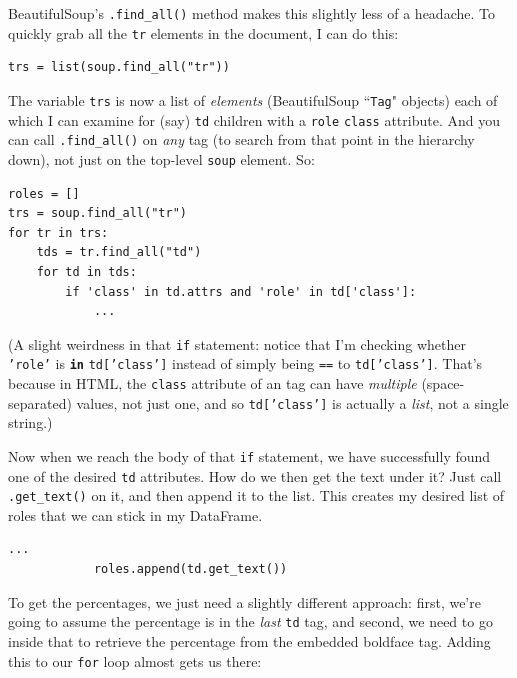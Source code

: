 \documentclass[12pt]{article}
\begin{document}
BeautifulSoup's \texttt{.find\_all()} method makes this slightly less of a
headache. To quickly grab all the \texttt{tr} elements in the document, I can
do this:

\begin{Verbatim}[fontsize=\small,samepage=true,frame=none]
trs = list(soup.find_all("tr"))
\end{Verbatim}

The variable \texttt{trs} is now a list of \textit{elements} (BeautifulSoup
``\texttt{Tag}" objects) each of which I can examine for (say) \texttt{td}
children with a \texttt{role} \texttt{class} attribute. And you can call
\texttt{.find\_all()} on \textit{any} tag (to search from that point in the
hierarchy down), not just on the top-level \texttt{soup} element. So:

\begin{Verbatim}[fontsize=\small,samepage=true,frame=none]
roles = []
trs = soup.find_all("tr")
for tr in trs:
    tds = tr.find_all("td")
    for td in tds:
        if 'class' in td.attrs and 'role' in td['class']:
            ...
\end{Verbatim}

(A slight weirdness in that \texttt{if} statement: notice that I'm checking
whether \texttt{'role'} is \textbf{\texttt{in}} \texttt{td['class']} instead
of simply being \texttt{==} to \texttt{td['class']}. That's because in HTML,
the \texttt{class} attribute of an tag can have \textit{multiple}
(space-separated) values, not just one, and so \texttt{td['class']} is
actually a \textit{list}, not a single string.)

Now when we reach the body of that \texttt{if} statement, we have successfully
found one of the desired \texttt{td} attributes. How do we then get the text
under it? Just call \texttt{.get\_text()} on it, and then append it to the
list. This creates my desired list of roles that we can stick in my DataFrame.

\begin{Verbatim}[fontsize=\small,samepage=true,frame=none]
            ...
            roles.append(td.get_text())
\end{Verbatim}

To get the percentages, we just need a slightly different approach: first,
we're going to assume the percentage is in the \textit{last} \texttt{td} tag,
and second, we need to go inside that to retrieve the percentage from the
embedded boldface tag. Adding this to our \texttt{for} loop almost gets us
there:
\end{document}
